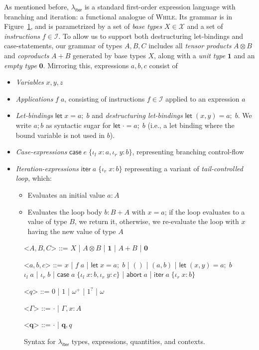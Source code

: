 \documentclass[acmsmall,screen,review]{acmart}
\newcommand{\mc}[1]{\ensuremath{\mathcal{#1}}}
\newcommand{\mb}[1]{\ensuremath{\mathbf{#1}}}
\newcommand{\ms}[1]{\ensuremath{\mathsf{#1}}}
\newcommand{\lto}{:}
\newcommand{\linl}[1]{\iota_l\;{#1}}
\newcommand{\linr}[1]{\iota_r\;{#1}}
\newcommand{\labort}[1]{\ms{abort}\;{#1}}
\newcommand{\letexpr}[3]{\ensuremath{\ms{let}\;#1 = #2;\;#3}}
\newcommand{\caseexpr}[5]{\ms{case}\;#1\;\{\linl{#2} \lto #3, \linr{#4} \lto #5\}}
\newcommand{\liter}[3]{\ms{iter}\;#1\;\{ \linr{#2} \lto #3 \}}
\newcommand{\subiterexp}{\texorpdfstring{\(\lambda_{\ms{iter}}\)}{lambda-iter}}
\newcommand{\zeroq}{0}
\newcommand{\oneq}{1}
\newcommand{\delq}{1^?}
\newcommand{\cpyq}{\omega^+}
\newcommand{\topq}{\omega}
\begin{document}
As mentioned before, \subiterexp{} is a standard first-order expression language with branching and
iteration: a functional analogue of \textsc{While}. Its grammar is in
Figure~\ref{fig:expr-syntax}, and is parametrized by a set of \emph{base types} $X \in \mc{X}$ and
a set of \emph{instructions} $f \in \mc{I}$. 
%
To allow us to support both destructuring let-bindings and case-statements, our grammar of types $A,
B, C$ includes all \emph{tensor products} $A \otimes B$ and \emph{coproducts} $A + B$ generated by
base types $X$, along with a \emph{unit type} $\mb{1}$ and an \emph{empty type} $\mb{0}$.
%
Mirroring this, expressions $a, b, c$ consist of
\begin{itemize}
  \item \emph{Variables} $x, y, z$
  \item \emph{Applications} $f\;a$, consisting of instructions $f \in \mc{I}$ applied to an
  expression $a$
  \item \emph{Let-bindings} $\letexpr{x}{a}{b}$ and \emph{destructuring let-bindings} $\letexpr{(x,
  y)}{a}{b}$. We write $a; b$ as syntactic sugar for $\letexpr{\cdot}{a}{b}$ (i.e., a let binding
  where the bound variable is not used in $b$).
  \item \emph{Case-expressions} $\caseexpr{e}{x}{a}{y}{b}$, representing branching control-flow
  \item \emph{Iteration-expressions} $\liter{a}{x}{b}$ representing a variant of
  \emph{tail-controlled loop}, which:
  \begin{itemize}
    \item Evaluates an initial value $a : A$
    \item Evaluates the loop body $b : B + A$ with $x = a$; if the loop evaluates to a value of type
    $B$, we return it, otherwise, we re-evaluate the loop with $x$ having the new value of type $A$
  \end{itemize}
\end{itemize}

\begin{figure}
  \begin{grammar}
    <\(A, B, C\)> ::= 
    \(X\)
    \;|\; \(A \otimes B\)
    \;|\; \(\mathbf{1}\)
    \;|\; \(A + B\)
    \;|\; \(\mathbf{0}\)

    <\(a, b, c\)> ::=
    \(x\)
    \;|\; \(f\;a\)
    \;|\; \(\letexpr{x}{a}{b}\)
    \;|\; \(()\)
    \;|\; \((a, b)\)
    \;|\; \(\letexpr{(x, y)}{a}{b}\)
    \alt  \(\linl{a}\)
    \;|\; \(\linr{b}\)
    \;|\; \(\caseexpr{a}{x}{b}{y}{c}\)
    \;|\; \(\labort{a}\)
    \;|\; \(\liter{a}{x}{b}\)
    
    <\(q\)> ::= \(\zeroq\) | \(\oneq\) | \(\cpyq\) | \(\delq\) | \(\topq\)

    <\(\Gamma\)> ::= \(\cdot\) \;|\; \(\Gamma, x : A\)

    <\(\mb{q}\)> ::= \(\cdot\) \;|\; \(\mb{q}, q\)
  \end{grammar}
  \caption{Syntax for \subiterexp{} types, expressions, quantities, and contexts.} \Description{}
  \label{fig:expr-syntax}
\end{figure}
\end{document}
